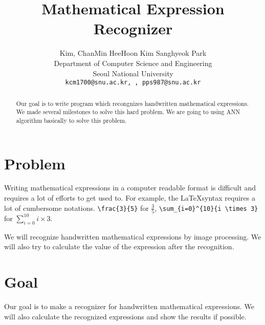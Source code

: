 \documentclass[10pt,twocolumn,letterpaper]{article}
\begin{document}
\title{Mathematical Expression Recognizer}

\author{Kim, ChanMin \qquad HeeHoon Kim \qquad Sanghyeok Park\\
Department of Computer Science and Engineering\\
Seoul National University\\
{\tt\small kcm1700@snu.ac.kr, , pps987@snu.ac.kr}
}

\maketitle

\begin{abstract}

Our goal is to write program which recongnizes handwritten mathematical expressions.
We made several milestones to solve this hard problem.
We are going to using ANN algorithm basically to solve this problem.

\end{abstract}

\section{Problem}

Writing mathematical expressions in a computer readable format is difficult and requires a lot of efforts to get used to.
For example, the \LaTeX syntax requires a lot of cumbersome notations. \verb'\frac{3}{5}' for $\frac{3}{5}$, \verb'\sum_{i=0}^{10}{i \times 3}' for $\sum_{i=0}^{10}{i \times 3}$.

We will recognize handwritten mathematical expressions by image processing.
We will also try to calculate the value of the expression after the recognition.



\section{Goal}

Our goal is to make a recognizer for handwritten mathematical expressions. We will also calculate the recognized expressions and show the results if possible.
\end{document}
